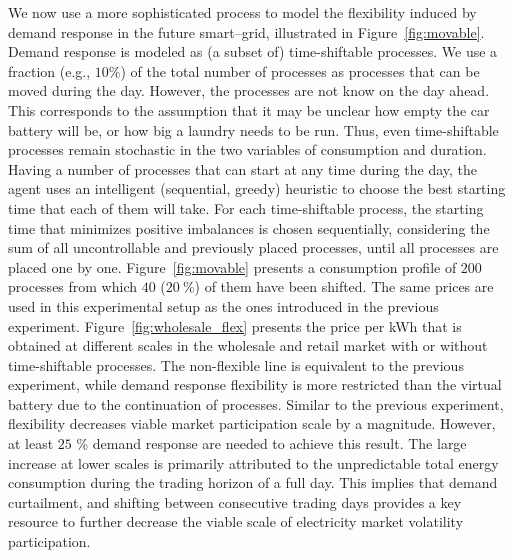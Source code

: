 \documentclass[conference]{IEEEtran}
\begin{document}
We now use a more sophisticated process to model the flexibility induced by demand response in the future smart--grid, illustrated in Figure~\ref{fig:movable}. Demand response is modeled as (a subset of) time-shiftable processes. We use a fraction (e.g., $10\%$) of the total number of processes as processes that can be moved during the day. However, the processes are not know on the day ahead. This corresponds to the assumption that it may be unclear how empty the car battery will be, or how big a laundry needs to be run. Thus, even time-shiftable processes remain stochastic in the two variables of consumption and duration.
Having a number of processes that can start at any time during the day, the agent uses an intelligent (sequential, greedy) heuristic to choose the best starting time that each of them will take. For each time-shiftable process, the starting time that minimizes positive imbalances is chosen sequentially, considering the sum of all uncontrollable and previously placed processes, until all processes are placed one by one. Figure~\ref{fig:movable} presents a consumption profile of $200$ processes from which $40$ ($20~\%$) of them have been shifted. The same prices are used in this experimental setup as the ones introduced in the previous experiment. Figure~\ref{fig:wholesale_flex} presents the price per kWh that is obtained at different scales in the wholesale and retail market with or without time-shiftable processes. The non-flexible line is equivalent to the previous experiment, while demand response flexibility is more restricted than the virtual battery due to the continuation of processes. Similar to the previous experiment, flexibility decreases viable market participation scale by a magnitude. However, at least $25$ \% demand response are needed to achieve this result.
The large increase at lower scales is primarily attributed to the unpredictable total energy consumption during the trading horizon of a full day. This implies that demand curtailment, and shifting between consecutive trading days provides a key resource to further decrease the viable scale of electricity market volatility participation.
\end{document}
